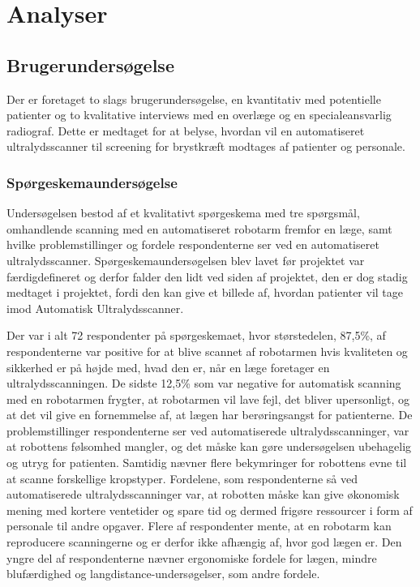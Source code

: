 \chapter{Analyser}\label{Analyser}

\section{Brugerundersøgelse}
Der er foretaget to slags brugerundersøgelse, en kvantitativ med potentielle patienter og to kvalitative interviews med en overlæge og en specialeansvarlig radiograf. Dette er medtaget for at belyse, hvordan vil en automatiseret ultralydsscanner til screening for brystkræft modtages af patienter og personale. 

\subsection{Spørgeskemaundersøgelse}
Undersøgelsen bestod af et kvalitativt spørgeskema med tre spørgsmål, omhandlende scanning med en automatiseret robotarm fremfor en læge, samt hvilke problemstillinger og fordele respondenterne ser ved en automatiseret ultralydsscanner. Spørgeskemaundersøgelsen blev lavet før projektet var færdigdefineret og derfor falder den lidt ved siden af projektet, den er dog stadig medtaget i projektet, fordi den kan give et billede af, hvordan patienter vil tage imod Automatisk Ultralydsscanner.  

Der var i alt 72 respondenter på spørgeskemaet, hvor størstedelen, 87,5\%, af respondenterne var positive for at blive scannet af robotarmen hvis kvaliteten og sikkerhed er på højde med, hvad den er, når en læge foretager en ultralydsscanningen. De sidste 12,5\% som var negative for automatisk scanning med en robotarmen frygter, at robotarmen vil lave fejl, det bliver upersonligt, og at det vil give en fornemmelse af, at lægen har berøringsangst for patienterne. 
De problemstillinger respondenterne ser ved automatiserede ultralydsscanninger, var at robottens følsomhed mangler, og det måske kan gøre undersøgelsen ubehagelig og utryg for patienten. Samtidig nævner flere bekymringer for robottens evne til at scanne forskellige kropstyper. Fordelene, som respondenterne så ved automatiserede ultralydsscanninger var, at robotten måske kan give økonomisk mening med kortere ventetider og spare tid og dermed frigøre ressourcer i form af personale til andre opgaver. Flere af respondenter mente, at en robotarm kan reproducere scanningerne og er derfor ikke afhængig af, hvor god lægen er. Den yngre del af respondenterne nævner ergonomiske fordele for lægen, mindre blufærdighed og langdistance-undersøgelser, som andre fordele. 

